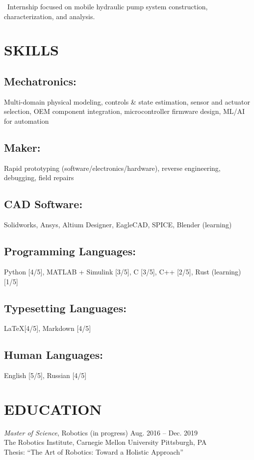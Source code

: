 \documentclass[]{article}
\begin{document}
\textellipsis~Internship focused on mobile hydraulic pump system construction,
characterization, and analysis.

\section*{SKILLS} 

\subsection*{Mechatronics:} 
Multi-domain physical modeling, controls \& state estimation, sensor and actuator selection, OEM component integration, microcontroller firmware design, ML/AI for automation

\subsection*{Maker:}
Rapid prototyping (software/electronics/hardware), reverse engineering, debugging, field repairs

\subsection*{CAD Software:}
Solidworks, Ansys, Altium Designer, EagleCAD, SPICE, Blender (learning)

\subsection*{Programming Languages:} 
Python [4/5], MATLAB + Simulink [3/5], C [3/5], C++ [2/5], Rust (learning) [1/5]

\subsection*{Typesetting Languages:}
\LaTeX [4/5], Markdown [4/5]

\subsection*{Human Languages:}
English [5/5], Russian [4/5]

\clearpage
\section*{EDUCATION}

\emph{Master of Science}, Robotics (in progress) \hfill Aug. 2016 -- Dec. 2019\\
The Robotics Institute, Carnegie Mellon University \hfill Pittsburgh, PA \\
Thesis: ``The Art of Robotics: Toward a Holistic Approach''\endnotemark \\
\end{document}
